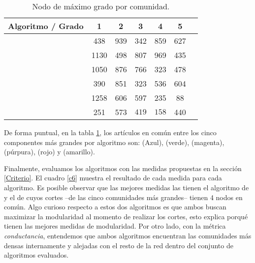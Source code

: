 \documentclass[12pt,letter]{article}
\begin{document}
\vspace{0.5cm}
\begin{table}[h!]
\centering
\begin{tabular}{lcccccc}
\textbf{Algoritmo / Grado} & 1 & 2 & 3 & 4 & 5\\ \hline 
   \cite{Blondel} &{\color{Magenta2}438}& {\color{RoyalBlue1} 939} & {\color{Red2} 342}&{\color{Tan1}859}&{\color{Purple3} 627} \\
  
   \cite{Clauset} &{\color{RoyalBlue2}1130}&{\color{Magenta2}498}&{\color{Purple3} 807}&969&435\\
  
   \cite{Girvan1, Girvan2} &{\color{RoyalBlue2} 1050}&{\color{Tan1}876}&{\color{SpringGreen4} 766}&323&{\color{Purple3} 478}\\
  
    \cite{Pons}    &{\color{Red2} 390}&{\color{RoyalBlue1} 851} &{\color{Magenta2}323} &{\color{Purple3}536}&{\color{SpringGreen4}604}\\
  
    \cite{Raghavan}  &{\color{RoyalBlue1}1258}&{\color{SpringGreen4} 606}&{\color{Tan1}597}&{\color{Magenta2}235}&88\\
  
    \cite{Rosvall1} &{\color{Red2} 251}&{\color{SpringGreen4} 573}&$419$&$158$&{\color{Purple3} 440}\\ \hline

\end{tabular}
\caption{\small{Nodo de máximo grado por comunidad}.}
\label{c9}
\end{table}

\vspace{0.5cm}

De forma puntual, en la tabla \ref{c9}, los artículos en común entre los cinco componentes más grandes por algoritmo son: \cite{Kydland} (Azul), \cite{Lucas1} (verde), \cite{Hall} (magenta), \cite{Blanchard} (púrpura), \cite{Rudebusch} (rojo) y \cite{Granger} (amarillo).


\vspace{0.5cm}
Finalmente, evaluamos los algoritmos con las medidas propuestas en la sección \ref{Criterio}. El cuadro \ref{c6} muestra el resultado de cada medida para cada algoritmo. Es posible observar que las mejores medidas las tienen el algoritmo de \cite{Blondel} y el de \cite{Clauset} cuyos cortes --de las cinco comunidades más grandes-- tienen 4 nodos en común. Algo curioso respecto a estos dos algoritmos es que ambos buscan maximizar la modularidad al momento de realizar los cortes, esto explica porqué tienen las mejores medidas de modularidad. Por otro lado, con la métrica \emph{conductancia}, entendemos que ambos algoritmos encuentran las comunidades más densas internamente y alejadas con el resto de la red dentro del conjunto de algoritmos evaluados.
\end{document}
